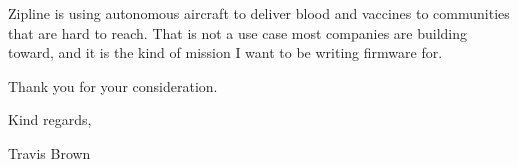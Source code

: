 \documentclass[11pt]{article}
\begin{document}
Zipline is using autonomous aircraft to deliver blood and vaccines to communities that are
hard to reach. That is not a use case most companies are building toward, and it is the
kind of mission I want to be writing firmware for.

Thank you for your consideration.

\vspace{16pt}
Kind regards,

\vspace{20pt}
Travis Brown
\end{document}
